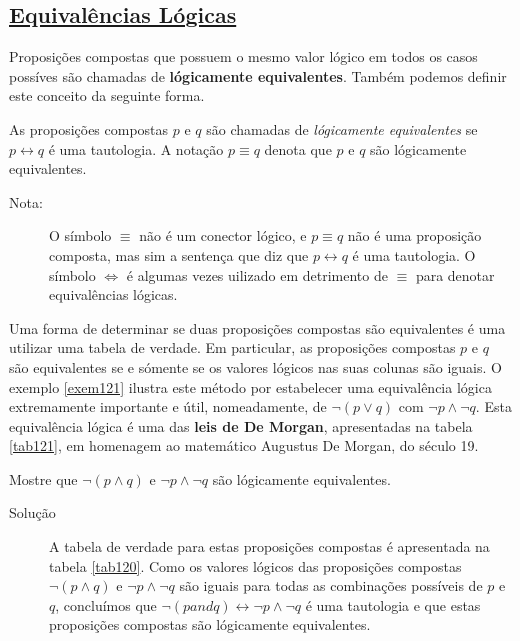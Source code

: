 \subsection*{\underline{Equivalências Lógicas}}

Proposições compostas que possuem o mesmo valor lógico em todos os casos
possíves são chamadas de \textbf{lógicamente equivalentes}. Também podemos
definir este conceito da seguinte forma.

\label{def18}
\begin{defn}
As proposições compostas $p$ e $q$ são chamadas de \emph{lógicamente
equivalentes} se $p \leftrightarrow q$ é uma tautologia. A notação $p \equiv q$
denota que $p$ e $q$ são lógicamente equivalentes.
\end{defn}

\begin{description}
\item[Nota:] O símbolo $\equiv$ não é um conector lógico, e $p \equiv q$ não é
uma proposição composta, mas sim a sentença que diz que $p \leftrightarrow q$ é
uma tautologia. O símbolo $\iff$ é algumas vezes uilizado em detrimento de
$\equiv$ para denotar equivalências lógicas.
\end{description}

Uma forma de determinar se duas proposições compostas são equivalentes é uma
utilizar uma tabela de verdade. Em particular, as proposições compostas $p$ e
$q$ são equivalentes se e sómente se os valores lógicos nas suas colunas são
iguais. O exemplo \ref{exem121} ilustra este método por estabelecer uma
equivalência lógica extremamente importante e útil, nomeadamente, de $\lnot
(p\lor q)$ com $\lnot p \land \lnot q$. Esta equivalência lógica é uma das
\textbf{leis de De Morgan}, apresentadas na tabela \ref{tab121}, em homenagem
ao matemático Augustus De Morgan, do século 19.


\begin{exmp}
\label{exem121}
Mostre que $\lnot (p \land q)$ e $\lnot p \land \lnot q$ são lógicamente
equivalentes.
\end{exmp}

\begin{description}
\item[Solução] A tabela de verdade para estas proposições compostas é
apresentada na tabela \ref{tab120}. Como os valores lógicos das proposições
compostas $\lnot (p \land q)$ e $\lnot p \land \lnot q$ são iguais para todas as
combinações possíveis de $p$ e $q$, concluímos que $\lnot (p and q)
\leftrightarrow \lnot p \land \lnot q$ é uma tautologia e que estas proposições
compostas são lógicamente equivalentes.
\end{description}

